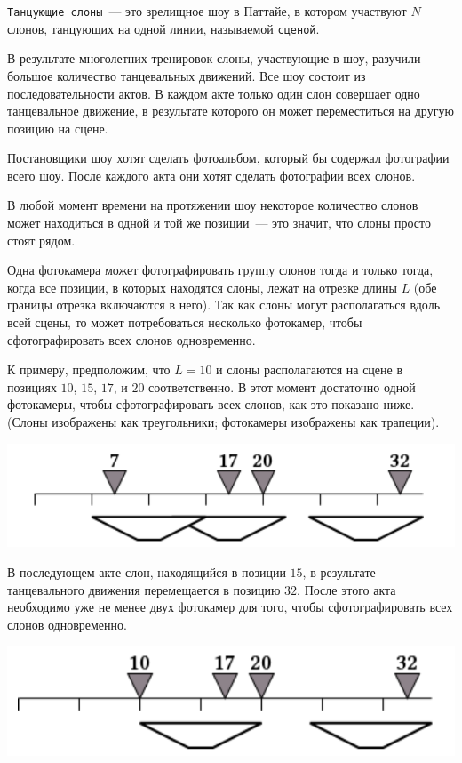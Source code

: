 \texttt{Танцующие слоны}~--- это зрелищное шоу в Паттайе, в котором участвуют $N$ слонов, танцующих на одной линии, называемой \texttt{сценой}.

В результате многолетних тренировок слоны, участвующие в шоу, разучили большое количество танцевальных движений. Все шоу состоит из последовательности актов. В каждом акте только один слон совершает одно танцевальное движение, в результате которого он может переместиться на другую позицию на сцене.

Постановщики шоу хотят сделать фотоальбом, который бы содержал фотографии всего шоу. После каждого акта они хотят сделать фотографии всех слонов.

В любой момент времени на протяжении шоу некоторое количество слонов может находиться в одной и той же позиции~--- это значит, что слоны просто стоят рядом.

Одна фотокамера может фотографировать группу слонов тогда и только тогда, когда все позиции, в которых находятся слоны, лежат на отрезке длины $L$ (обе границы отрезка включаются в него). Так как слоны могут располагаться вдоль всей сцены, то может потребоваться несколько фотокамер, чтобы сфотографировать всех слонов одновременно.

К примеру, предположим, что $L=10$ и слоны располагаются на сцене в позициях $10$, $15$, $17$, и $20$ соответственно. В этот момент достаточно одной фотокамеры, чтобы сфотографировать всех слонов, как это показано ниже. (Слоны изображены как треугольники; фотокамеры изображены как трапеции).

\includegraphics{elephants1.png}

В последующем акте слон, находящийся в позиции $15$, в результате танцевального движения перемещается в позицию $32$. После этого акта необходимо уже не менее двух фотокамер для того, чтобы сфотографировать всех слонов одновременно.

\includegraphics{elephants2.png}

